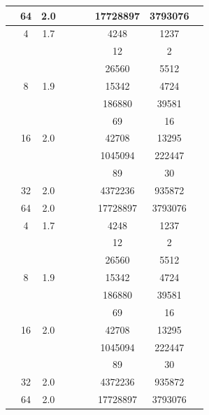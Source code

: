 \begin{table}[htbp]
\begin{tabular}{l S[table-format=3.0] S[table-format=4.1] l S[table-format=6.0] S[table-format=6.0] S[table-format=6.0] S[table-format=5.0] S[table-format=2.0]}
     & 64 & 2.0 &  & {\text{---}} & {\text{---}} & 17728897 & 3793076 & {\text{---}} \\
    \midrule
     & 4 & 1.7 &  & {\text{---}} & {\text{---}} & 4248 & 1237 & {\text{---}} \\
     &  &  &  & {\text{---}} & {\text{---}} & 12 & 2 & {\text{---}} \\
     &  &  &  & {\text{---}} & {\text{---}} & 26560 & 5512 & {\text{---}} \\
     & 8 & 1.9 &  & {\text{---}} & {\text{---}} & 15342 & 4724 & {\text{---}} \\
     &  &  &  & {\text{---}} & {\text{---}} & 186880 & 39581 & {\text{---}} \\
     &  &  &  & {\text{---}} & {\text{---}} & 69 & 16 & {\text{---}} \\
     & 16 & 2.0 &  & {\text{---}} & {\text{---}} & 42708 & 13295 & {\text{---}} \\
     &  &  &  & {\text{---}} & {\text{---}} & 1045094 & 222447 & {\text{---}} \\
     &  &  &  & {\text{---}} & {\text{---}} & 89 & 30 & {\text{---}} \\
     & 32 & 2.0 &  & {\text{---}} & {\text{---}} & 4372236 & 935872 & {\text{---}} \\
     & 64 & 2.0 &  & {\text{---}} & {\text{---}} & 17728897 & 3793076 & {\text{---}} \\
    \midrule
     & 4 & 1.7 &  & {\text{---}} & {\text{---}} & 4248 & 1237 & {\text{---}} \\
     &  &  &  & {\text{---}} & {\text{---}} & 12 & 2 & {\text{---}} \\
     &  &  &  & {\text{---}} & {\text{---}} & 26560 & 5512 & {\text{---}} \\
     & 8 & 1.9 &  & {\text{---}} & {\text{---}} & 15342 & 4724 & {\text{---}} \\
     &  &  &  & {\text{---}} & {\text{---}} & 186880 & 39581 & {\text{---}} \\
     &  &  &  & {\text{---}} & {\text{---}} & 69 & 16 & {\text{---}} \\
     & 16 & 2.0 &  & {\text{---}} & {\text{---}} & 42708 & 13295 & {\text{---}} \\
     &  &  &  & {\text{---}} & {\text{---}} & 1045094 & 222447 & {\text{---}} \\
     &  &  &  & {\text{---}} & {\text{---}} & 89 & 30 & {\text{---}} \\
     & 32 & 2.0 &  & {\text{---}} & {\text{---}} & 4372236 & 935872 & {\text{---}} \\
     & 64 & 2.0 &  & {\text{---}} & {\text{---}} & 17728897 & 3793076 & {\text{---}} \\
    \bottomrule
  \end{tabular}
\end{table}
